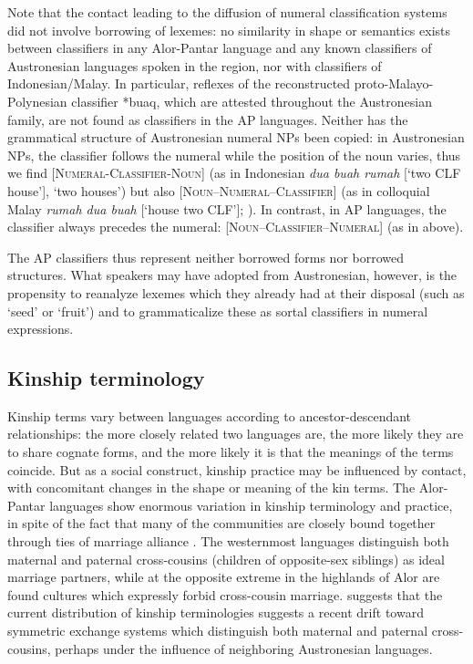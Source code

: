 Note that the contact leading to the diffusion of numeral classification systems did not involve borrowing of lexemes: no similarity in shape or semantics exists between classifiers in any Alor-Pantar language and any known classifiers of Austronesian languages spoken in the region, nor with classifiers of Indonesian/Malay. In particular, reflexes of the reconstructed proto-Malayo-Polynesian classifier *buaq, which are attested throughout the Austronesian family, are not found as classifiers in the AP languages. Neither has the grammatical structure of Austronesian numeral NPs been copied: in Austronesian NPs, the classifier follows the numeral while the position of the noun varies, thus we find [\textsc{Numeral-Classifier-Noun}] (as in Indonesian \textit{dua buah rumah} [`two CLF house'], `two houses') but also \textsc{[Noun--Numeral--Classifier]} (as in colloquial Malay \textit{rumah dua buah} [`house two CLF']; \citealt[283-284]{Blust2009}). In contrast, in AP languages, the classifier always precedes the numeral: \textsc{[Noun--Classifier--Numeral]} (as in  above).

The AP classifiers thus represent neither borrowed forms nor borrowed structures. What speakers may have adopted from Austronesian, however, is the propensity to reanalyze lexemes which they already had at their disposal (such as `seed' or `fruit') and to grammaticalize these as sortal classifiers in numeral expressions. 

\subsection{Kinship terminology}\label{sec:1:6.4}
Kinship terms vary between languages according to ancestor-descendant relationships: the more closely related two languages are, the more likely they are to share cognate forms, and the more likely it is that the meanings of the terms coincide. But as a social construct, kinship practice may be influenced by contact, with concomitant changes in the shape or meaning of the kin terms. The Alor-Pantar languages show enormous variation in kinship terminology and practice, in spite of the fact that many of the communities are closely bound together through ties of marriage alliance \citep{HoltonTVkinship}. The westernmost languages distinguish both maternal and paternal cross-cousins (children of opposite-sex siblings) as ideal marriage partners, while at the opposite extreme in the highlands of Alor are found cultures which expressly forbid cross-cousin marriage.  \citet{HoltonTVkinship} suggests that the current distribution of kinship terminologies suggests a recent drift toward symmetric exchange systems which distinguish both maternal and paternal cross-cousins, perhaps under the influence of neighboring Austronesian languages. 

